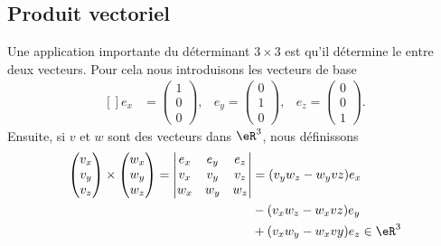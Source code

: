 \subsection{Produit vectoriel}

Une application importante du déterminant $3\times 3$ est qu'il détermine le  entre deux vecteurs. Pour cela nous introduisons les vecteurs de base
\begin{equation}
    \begin{aligned}[]
        e_x&=\begin{pmatrix}
            1    \\ 
            0    \\ 
            0    
        \end{pmatrix}
        ,&e_y=\begin{pmatrix}
            0    \\ 
            1    \\ 
            0    
        \end{pmatrix},&e_z=\begin{pmatrix}
            0    \\ 
            0    \\ 
            1    
        \end{pmatrix}.
    \end{aligned}
\end{equation}
Ensuite, si $v$ et $w$ sont des vecteurs dans $\eR^3$, nous définissons
\begin{equation}
    \begin{aligned}[]
        \begin{pmatrix}
            v_x    \\ 
            v_y    \\ 
            v_z    
        \end{pmatrix}\times\begin{pmatrix}
            w_x    \\ 
            w_y    \\ 
            w_z    
        \end{pmatrix}=
        \begin{vmatrix}
              e_x  &   e_y    &   e_z    \\
              v_x  &   v_y    &   v_z    \\
              w_x  &   w_y    &   w_z    \\
        \end{vmatrix}&=
        (v_yw_z-w_yvz)e_x\\
        &-(v_xw_z-w_xvz)e_y\\
        &+(v_xw_y-w_xvy)e_z\in\eR^3
    \end{aligned}
\end{equation}

